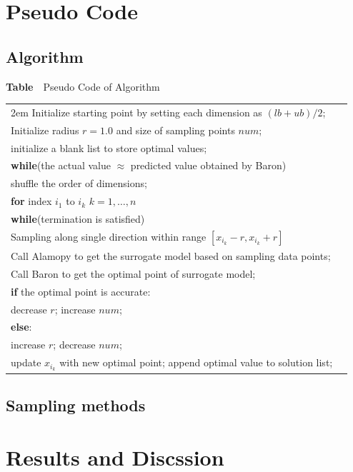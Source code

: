 \documentclass{article}
\begin{document}
\section{Pseudo Code}
\subsection{Algorithm}
\begin{center}
\textbf{Table}~~Pseudo Code of Algorithm
\begin{tabular}{lp{3cm}}
  \hline
  \hangafter=1
  \hangindent 2em
  Initialize starting point by setting each dimension as $(lb+ub)/2$;\\
  Initialize radius $r=1.0$ and size of sampling points $num$;\\
  initialize a blank list to store optimal values;\\
  \textbf{while}(the actual value $\approx$ predicted value obtained by Baron)\\
  \quad shuffle the order of dimensions;\\
  \quad\textbf{for} index $i_{1}$ to $i_k$ $k = 1, \dots ,n$\\
  \qquad\textbf{while}(termination is satisfied)\\
  \qquad\quad Sampling along single direction within range $[x_{i_k}-r,x_{i_k}+r]$\\
  \qquad\quad Call Alamopy to get the surrogate model based on sampling data points;\\
  \qquad\quad Call Baron to get the optimal point of surrogate model;\\
  \qquad\quad \textbf{if} the optimal point is accurate:\\
  \qquad\quad\quad decrease $r$; increase $num$;\\
  \qquad\quad \textbf{else}:\\
  \qquad\quad\quad increase $r$; decrease $num$;\\
  \qquad update $x_{i_k}$ with new optimal point; append optimal value to solution list;\\
  \hline
\end{tabular}  
\end{center}

\subsection{Sampling methods}

\section{Results and Discssion}

\end{document}
